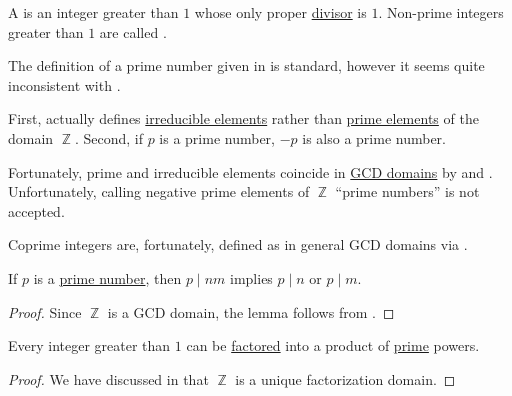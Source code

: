 \begin{definition}\label{def:prime_number}
  A  is an integer greater than \( 1 \) whose only proper \hyperref[def:divisibility]{divisor} is \( 1 \). Non-prime integers greater than \( 1 \) are called .
\end{definition}

\begin{remark}\label{rem:prime_numbers}
  The definition of a prime number given in  is standard, however it seems quite inconsistent with .

  First,  actually defines \hyperref[def:domain_divisibility/irreducible]{irreducible elements} rather than \hyperref[def:domain_divisibility/prime]{prime elements} of the domain \( \BbbZ \). Second, if \( p \) is a prime number, \( -p \) is also a prime number.

  Fortunately, prime and irreducible elements coincide in \hyperref[def:gcd_domain]{GCD domains} by  and . Unfortunately, calling negative prime elements of \( \BbbZ \) \enquote{prime numbers} is not accepted.

  Coprime integers are, fortunately, defined as in general GCD domains via .
\end{remark}

\begin{lemma}\label{thm:euclids_lemma}
  If \( p \) is a \hyperref[def:prime_number]{prime number}, then \( p \mid nm \) implies \( p \mid n \) or \( p \mid m \).
\end{lemma}
\begin{proof}
  Since \( \BbbZ \) is a GCD domain, the lemma follows from .
\end{proof}

\begin{theorem}\label{thm:fundamental_theorem_of_arithmetic}
  Every integer greater than \( 1 \) can be \hyperref[def:irreducible_factorization]{factored} into a product of \hyperref[def:prime_number]{prime} powers.
\end{theorem}
\begin{proof}
  We have discussed in  that \( \BbbZ \) is a unique factorization domain.
\end{proof}

